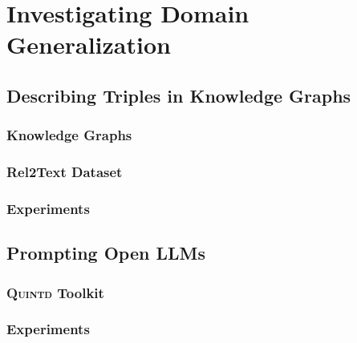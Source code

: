 
\chapter{Investigating Domain Generalization}
\label{chap:investigating}
\section{Describing Triples in Knowledge Graphs}
\label{sec:describing}
\subsection{Knowledge Graphs}
\label{sec:kgs}
\subsection{Rel2Text Dataset}
\label{sec:rel2text}
\subsection{Experiments}
\label{sec:rel2text-exp}
\section{Prompting Open LLMs}
\label{sec:prompting}
\subsection{\textsc{Quintd} Toolkit}
\label{sec:quintd}
\subsection{Experiments}
\label{sec:quintd-exp}